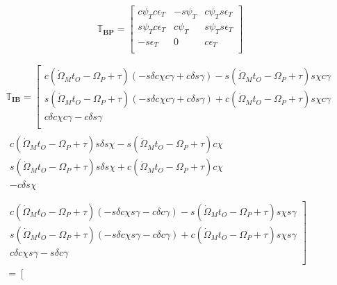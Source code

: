 \begin{equation} \label{eq:BPtrans}
\mathbb{T}_{\mathbf{BP}}=
\begin{bmatrix}
c\psi_{T}c\epsilon_{T} & -s\psi_{T} & c\psi_{T}s\epsilon_{T}\\
s\psi_{T}c\epsilon_{T} & c\psi_{T} & s\psi_{T}s\epsilon_{T}\\
-s\epsilon_{T} & 0 & c\epsilon_{T}\\
\end{bmatrix}
\end{equation}

\begin{multline} \label{eq:IBtrans}
\mathbb{T}_{\mathbf{IB}}=
\left[
\begin{matrix}
c\left(\dot{\Omega}_{M}t_{O}-\Omega_{P}+\tau\right)\left(-s\delta c\chi c\gamma +c\delta s\gamma \right)-s\left(\dot{\Omega}_{M}t_{O}-\Omega_{P}+\tau\right) s\chi c\gamma    \\
s\left(\dot{\Omega}_{M}t_{O}-\Omega_{P}+\tau\right)\left(-s\delta c\chi c\gamma +c\delta s\gamma \right)+c\left(\dot{\Omega}_{M}t_{O}-\Omega_{P}+\tau\right) s\chi c\gamma   \\
c\delta c\chi c\gamma -c\delta s\gamma    \\
\end{matrix}  \right.
\\
\begin{matrix}
c\left(\dot{\Omega}_{M}t_{O}-\Omega_{P}+\tau\right) s\delta s\chi -s\left(\dot{\Omega}_{M}t_{O}-\Omega_{P}+\tau\right) c\chi\\
s\left(\dot{\Omega}_{M}t_{O}-\Omega_{P}+\tau\right) s\delta s\chi +c\left(\dot{\Omega}_{M}t_{O}-\Omega_{P}+\tau\right) c\chi \\
 -c\delta s\chi \\
\end{matrix}
\\
\left.
\begin{matrix}
c\left(\dot{\Omega}_{M}t_{O}-\Omega_{P}+\tau\right)\left(-s\delta c\chi s\gamma -c\delta c\gamma \right)-s\left(\dot{\Omega}_{M}t_{O}-\Omega_{P}+\tau\right) s\chi s\gamma\\
s\left(\dot{\Omega}_{M}t_{O}-\Omega_{P}+\tau\right)\left(-s\delta c\chi s\gamma -c\delta c\gamma \right)+c\left(\dot{\Omega}_{M}t_{O}-\Omega_{P}+\tau\right) s\chi s\gamma \\
c\delta c\chi s\gamma -s\delta c\gamma\\
\end{matrix}
\right]\\
=
\left[

\end{multline}
